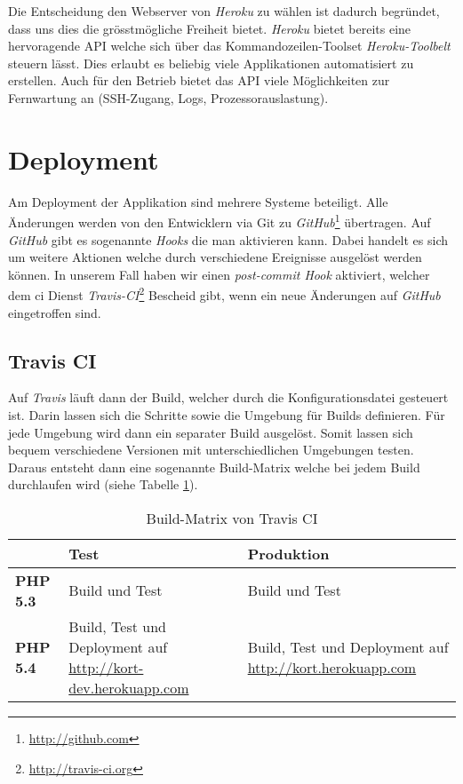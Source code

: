 Die Entscheidung den Webserver von \emph{Heroku} zu wählen ist dadurch begründet, dass uns dies die grösstmögliche Freiheit bietet. 
\emph{Heroku} bietet bereits eine hervoragende \gls{API} welche sich über das Kommandozeilen-Toolset \emph{Heroku-Toolbelt} steuern lässt.
Dies erlaubt es beliebig viele Applikationen automatisiert zu erstellen.
Auch für den Betrieb bietet das \gls{API} viele Möglichkeiten zur Fernwartung an (SSH-Zugang, Logs, Prozessorauslastung).

\section{Deployment}
Am Deployment der Applikation sind mehrere Systeme beteiligt. 
Alle Änderungen werden von den Entwicklern via \gls{Git} zu \emph{GitHub}\footnote{\url{http://github.com}} übertragen. 
Auf \emph{GitHub} gibt es sogenannte \emph{Hooks} die man aktivieren kann. 
Dabei handelt es sich um weitere Aktionen welche durch verschiedene Ereignisse ausgelöst werden können. 
In unserem Fall haben wir einen \emph{post-commit Hook} aktiviert, welcher dem \gls{ci} Dienst \emph{Travis-CI}\footnote{\url{http://travis-ci.org}} Bescheid gibt, wenn ein neue Änderungen auf \emph{GitHub} eingetroffen sind.

\subsection{Travis CI}
Auf \emph{Travis} läuft dann der Build, welcher durch die Konfigurationsdatei  gesteuert ist. Darin lassen sich die Schritte sowie die Umgebung für Builds definieren.
Für jede Umgebung wird dann ein separater Build ausgelöst.
Somit lassen sich bequem verschiedene Versionen mit unterschiedlichen Umgebungen testen.
Daraus entsteht dann eine sogenannte Build-Matrix welche bei jedem Build durchlaufen wird (siehe Tabelle \ref{infrastruktur-build-matrix}).

\begin{table}[H]
\centering
\begin{tabular}{|p{0.15\threecelltabwidth}|p{0.425\threecelltabwidth}|p{0.425\threecelltabwidth}|}
\hline 
 & \textbf{Test} & \textbf{Produktion} \\
\hline 
\textbf{PHP 5.3} & Build und Test & Build und Test \\
\hline 
\textbf{PHP 5.4} & Build, Test und Deployment auf \url{http://kort-dev.herokuapp.com} & Build, Test und Deployment auf \url{http://kort.herokuapp.com} \\
\hline 
\end{tabular} 
\caption{Build-Matrix von Travis CI}
\label{infrastruktur-build-matrix}
\end{table}

